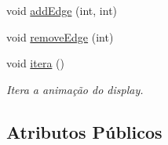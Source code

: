 \begin{DoxyCompactItemize}
\item 
void \mbox{\hyperlink{classGraphDisplay_a77ab2c4ae2c7facff5034e140e43ed73}{add\+Edge}} (int, int)
\item 
void \mbox{\hyperlink{classGraphDisplay_adb5477315cf0e2435556c999a7c0cb8c}{remove\+Edge}} (int)
\item 
\mbox{\label{classGraphDisplay_a977dc7ae1425c60e7c87de6cabe9e29f}} 
void \mbox{\hyperlink{classGraphDisplay_a977dc7ae1425c60e7c87de6cabe9e29f}{itera}} ()
\begin{DoxyCompactList}\small\item\em Itera a animação do display. \end{DoxyCompactList}\end{DoxyCompactItemize}
\subsection*{Atributos Públicos}

